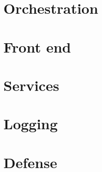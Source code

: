 \documentclass[letterpaper,twocolumn,10pt]{article}
\begin{document}
\section{Orchestration}


\section{Front end}


\section{Services}


\section{Logging}


\section{Defense}





\end{document}
